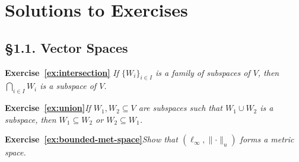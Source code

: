 \chapter*{Solutions to Exercises}

\section*{\S\hspace{4pt}1.1. Vector Spaces}
    \phantom{a}
    \vspace{12pt}

    \textbf{Exercise~\ref{ex:intersection}}\hspace{6pt} \textit{If $\{W_i\}_{i \in I}$ is a family of subspaces of $V$, then $\bigcap_{i \in I}W_i$ is a subspace of $V$.}
        \begin{solution}
        
        \end{solution}
        \vspace{8pt}

    \textbf{Exercise~\ref{ex:union}}\hspace{6pt}\textit{If $W_1,W_2 \subseteq V$ are subspaces such that $W_1 \cup W_2$ is a subspace, then $W_1 \subseteq W_2$ or $W_2 \subseteq W_1$.}
        \begin{solution}
            
        \end{solution}
        \vspace{8pt}

    \textbf{Exercise~\ref{ex:bounded-met-space}}\hspace{6pt}\textit{Show that $(\ell_\infty, \lVert \cdot \rVert _u)$ forms a metric space.}
        \begin{solution}
                
        \end{solution}
        \vspace{8pt}

